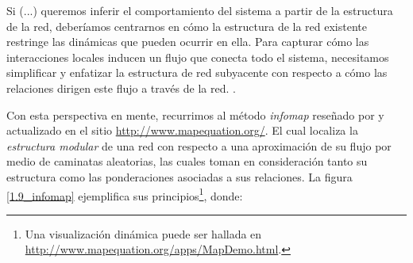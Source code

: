 \documentclass[letterpaper, 11pt]{book}
\theoremstyle{definition}
\theoremstyle{remark}
\begin{document}
\begin{center}
    \begin{minipage}{0.9\linewidth}
        {\setlength{\parindent}{12pt}\small
        Si (...) queremos inferir el comportamiento del sistema a partir de la estructura de la red, deberíamos centrarnos en cómo la estructura de la red existente restringe las dinámicas que pueden ocurrir en ella. 
        Para capturar cómo las interacciones locales inducen un flujo que conecta todo el sistema, necesitamos simplificar y enfatizar la estructura de red subyacente con respecto a cómo las relaciones dirigen este flujo a través de la red.
        \normalsize \citep[13]{2009_Rosvall_MapEquation}.
        }
    \end{minipage}
\end{center}



Con esta perspectiva en mente, recurrimos al método \emph{infomap} reseñado por \citet{2009_Rosvall_MapEquation} y actualizado en el sitio \url{http://www.mapequation.org/}. 
El cual localiza la \emph{estructura modular} de una red con respecto a una aproximación de su flujo por medio de caminatas aleatorias, las cuales toman en consideración tanto su estructura como las ponderaciones asociadas a sus relaciones. 
La figura \ref{1.9_infomap} ejemplifica sus principios\footnote{
    Una visualización dinámica puede ser hallada en \url{http://www.mapequation.org/apps/MapDemo.html}. 
}, donde: 
\end{document}
